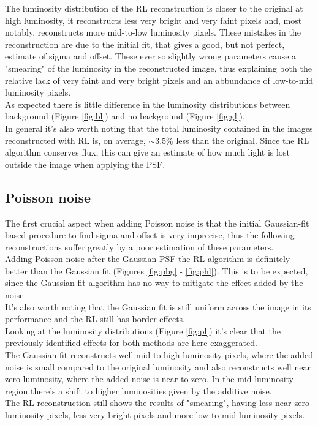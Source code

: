 \documentclass[a4paper]{article}
\begin{document}
\begin{multicols}{2}
			The luminosity distribution of the RL reconstruction is closer to the original at high luminosity, it reconstructs less very bright and very faint pixels and, most notably, reconstructs more mid-to-low luminosity pixels. These mistakes in the reconstruction are due to the initial fit, that gives a good, but not perfect, estimate of sigma and offset. These ever so slightly wrong parameters cause a "smearing" of the luminosity in the reconstructed image, thus explaining both the relative lack of very faint and very bright pixels and an abbundance of low-to-mid luminosity pixels.\\
			
			As expected there is little difference in the luminosity distributions between background (Figure \ref{fig:bl}) and no background (Figure \ref{fig:gl}).\\
			
			In general it's also worth noting that the total luminosity contained in the images reconstructed with RL is, on average, $\sim 3.5\%$ less than the original. Since the RL algorithm conserves flux, this can give an estimate of how much light is lost outside the image when applying the PSF.
		
		\newpage
		\subsection{Poisson noise}
			The first crucial aspect when adding Poisson noise is that the initial Gaussian-fit based procedure to find sigma and offset is very imprecise, thus the following reconstructions suffer greatly by a poor estimation of these parameters.\\
			
			Adding Poisson noise after the Gaussian PSF the RL algorithm is definitely better than the Gaussian fit (Figures \ref{fig:pbg} - \ref{fig:phl}). This is to be expected, since the Gaussian fit algorithm has no way to mitigate the effect added by the noise.\\
			It's also worth noting that the Gaussian fit is still uniform across the image in its performance and the RL still has border effects.\\
			
			Looking at the luminosity distributions (Figure \ref{fig:pl}) it's clear that the previously identified effects for both methods are here exaggerated.\\
			
			The Gaussian fit reconstructs well mid-to-high luminosity pixels, where the added noise is small compared to the original luminosity and also reconstructs well near zero luminosity, where the added noise is near to zero. In the mid-luminosity region there's a shift to higher luminosities given by the additive noise.\\
			
			The RL reconstruction still shows the results of "smearing", having less near-zero luminosity pixels, less very bright pixels and more low-to-mid luminosity pixels.	
	\end{multicols}
\end{document}
